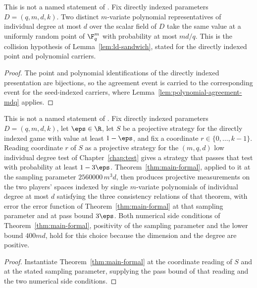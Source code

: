 \begin{lemma}
	\label{lem:direct-ld-polynomial-agreement}
	\leanok
	This is not a named statement of \cite{Ji2020MIPStar}. Fix directly indexed
	parameters $D=(q,m,d,k)$. Two distinct $m$-variate polynomial representatives
	of individual degree at most $d$ over the scalar field of $D$ take the same
	value at a uniformly random point of $\F_q^m$ with probability at most
	$md/q$. This is the collision hypothesis of Lemma~\ref{lem:ld-sandwich},
	stated for the directly indexed point and polynomial carriers.
\end{lemma}
\begin{proof}
	\leanok
	The point and polynomial identifications of the directly indexed presentation
	are bijections, so the agreement event is carried to the corresponding event
	for the seed-indexed carriers, where
	Lemma~\ref{lem:polynomial-agreement-mdq} applies.
\end{proof}

\begin{lemma}
	\label{lem:direct-ld-coordinate-soundness}
	\leanok
	This is not a named statement of \cite{Ji2020MIPStar}. Fix directly indexed
	parameters $D=(q,m,d,k)$, let $\eps\in\R$, let $S$ be a projective strategy
	for the directly indexed game with value at least $1-\eps$, and fix a
	coordinate $r\in\{0,\ldots,k-1\}$. Reading coordinate $r$ of $S$ as a
	projective strategy for the $(m,q,d)$ low individual degree test of
	Chapter~\ref{chap:test} gives a strategy that passes that test with
	probability at least $1-3\eps$. Theorem~\ref{thm:main-formal}, applied to it
	at the sampling parameter $2560000\,m^3d$, then produces projective
	measurements on the two players' spaces indexed by single $m$-variate
	polynomials of individual degree at most $d$ satisfying the three consistency
	relations of that theorem, with error the error function of
	Theorem~\ref{thm:main-formal} at that sampling parameter and at pass bound
	$3\eps$. Both numerical side conditions of Theorem~\ref{thm:main-formal},
	positivity of the sampling parameter and the lower bound $400md$, hold for
	this choice because the dimension and the degree are positive.
\end{lemma}
\begin{proof}
	\leanok
	Instantiate Theorem~\ref{thm:main-formal} at the coordinate reading of $S$
	and at the stated sampling parameter, supplying the pass bound of that
	reading and the two numerical side conditions.
\end{proof}

